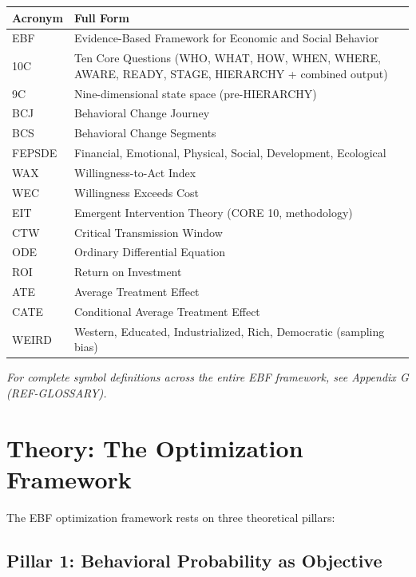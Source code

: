 \begin{longtable}{@{}p{2.8cm}p{10cm}@{}}
\toprule
\textbf{Acronym} & \textbf{Full Form} \\
\midrule
\endhead
EBF & Evidence-Based Framework for Economic and Social Behavior \\
10C & Ten Core Questions (WHO, WHAT, HOW, WHEN, WHERE, AWARE, READY, STAGE, HIERARCHY + combined output) \\
9C & Nine-dimensional state space (pre-HIERARCHY) \\
BCJ & Behavioral Change Journey \\
BCS & Behavioral Change Segments \\
FEPSDE & Financial, Emotional, Physical, Social, Development, Ecological \\
WAX & Willingness-to-Act Index \\
WEC & Willingness Exceeds Cost \\
EIT & Emergent Intervention Theory (CORE 10, methodology) \\
CTW & Critical Transmission Window \\
ODE & Ordinary Differential Equation \\
ROI & Return on Investment \\
ATE & Average Treatment Effect \\
CATE & Conditional Average Treatment Effect \\
WEIRD & Western, Educated, Industrialized, Rich, Democratic (sampling bias) \\
\bottomrule
\end{longtable}

\vspace{1em}
\textit{For complete symbol definitions across the entire EBF framework, see Appendix G (REF-GLOSSARY).}

\section{Theory: The Optimization Framework}
\label{sec:mp-theory}

The EBF optimization framework rests on three theoretical pillars:

\subsection{Pillar 1: Behavioral Probability as Objective}

